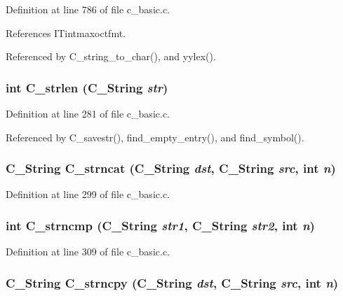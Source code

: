 Definition at line 786 of file c\_\-basic.c.

References ITintmaxoctfmt.

Referenced by C\_\-string\_\-to\_\-char(), and yylex().
\subsubsection{\setlength{\rightskip}{0pt plus 5cm}int C\_\-strlen (\bf{C\_\-String} {\em str})}\label{c__basic_8c_fee59d2befb71fb91885019f5db7e90e}




Definition at line 281 of file c\_\-basic.c.

Referenced by C\_\-savestr(), find\_\-empty\_\-entry(), and find\_\-symbol().
\subsubsection{\setlength{\rightskip}{0pt plus 5cm}\bf{C\_\-String} C\_\-strncat (\bf{C\_\-String} {\em dst}, \bf{C\_\-String} {\em src}, int {\em n})}\label{c__basic_8c_301fe5d1daaaca499b82caa6f3dc4121}




Definition at line 299 of file c\_\-basic.c.
\subsubsection{\setlength{\rightskip}{0pt plus 5cm}int C\_\-strncmp (\bf{C\_\-String} {\em str1}, \bf{C\_\-String} {\em str2}, int {\em n})}\label{c__basic_8c_0b4a4f69d0dd1cc1cb27c805a435fe3e}




Definition at line 309 of file c\_\-basic.c.
\subsubsection{\setlength{\rightskip}{0pt plus 5cm}\bf{C\_\-String} C\_\-strncpy (\bf{C\_\-String} {\em dst}, \bf{C\_\-String} {\em src}, int {\em n})}\label{c__basic_8c_7686316289a8d891cb8fbb45e34cb502}




